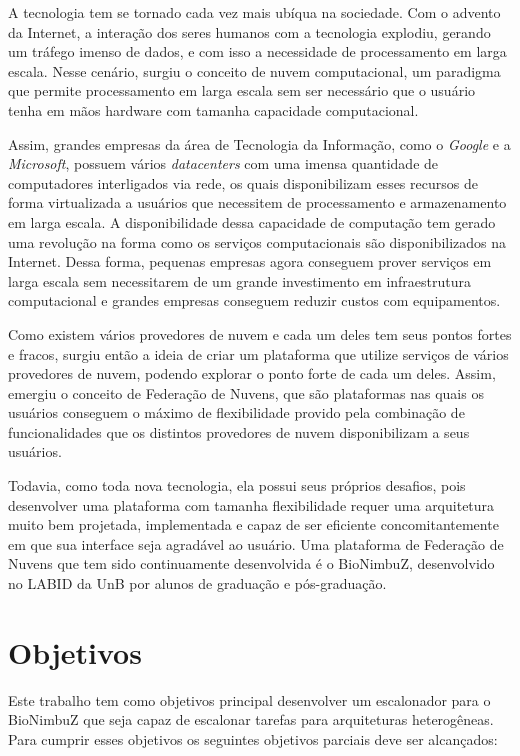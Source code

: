 A tecnologia tem se tornado cada vez mais ubíqua na sociedade. Com o advento da Internet, a interação dos seres humanos com a tecnologia explodiu, gerando um tráfego imenso de dados, e com isso a necessidade de processamento em larga escala. Nesse cenário, surgiu o conceito de nuvem computacional, um paradigma que permite processamento em larga escala sem ser necessário que o usuário tenha em mãos hardware com tamanha capacidade computacional.

Assim, grandes empresas da área de Tecnologia da Informação, como o \textit{Google} e a \textit{Microsoft}, possuem vários \textit{datacenters} com uma imensa quantidade de computadores interligados via rede, os quais disponibilizam esses recursos de forma virtualizada a usuários que necessitem de processamento e armazenamento em larga escala. A disponibilidade dessa capacidade de computação tem gerado uma revolução na forma como os serviços computacionais são disponibilizados na Internet.
Dessa forma, pequenas empresas agora conseguem prover serviços em larga escala sem necessitarem de um grande investimento em infraestrutura computacional e grandes empresas conseguem reduzir custos com equipamentos.

Como existem vários provedores de nuvem e cada um deles tem seus pontos fortes e fracos, surgiu então a ideia de criar um plataforma que utilize serviços de vários provedores de nuvem, podendo explorar o ponto forte de cada um deles. Assim, emergiu o conceito de Federação de Nuvens, que são plataformas nas quais os usuários conseguem o máximo de flexibilidade provido pela combinação de funcionalidades que os distintos provedores de nuvem disponibilizam a seus usuários.

Todavia, como toda nova tecnologia, ela possui seus próprios desafios, pois desenvolver uma plataforma com tamanha flexibilidade requer uma arquitetura muito bem projetada, implementada e capaz de ser eficiente concomitantemente em que sua interface seja agradável ao usuário. Uma plataforma de Federação de Nuvens que tem sido continuamente desenvolvida é o BioNimbuZ, desenvolvido no \acrfull{LABID} da \acrfull{UnB}\cite{BioNimbuZ_Breno_Deric} \cite{BioNimbuZ_Closer} \cite{BioNimbuZ_6846526} \cite{Saldanha2012} \cite{6732620_BioNimbuZ_ACOsched} \cite{BioNimbuZ_Willian_C99} \cite{closer12_BioNimbuZ_AHP} \cite{Saldanha_BioNimbus} por alunos de graduação e pós-graduação.


\section{Objetivos}
Este trabalho tem como objetivos principal desenvolver um escalonador para o BioNimbuZ que seja capaz de escalonar tarefas para arquiteturas heterogêneas. Para cumprir esses objetivos os seguintes objetivos parciais deve ser alcançados: 

